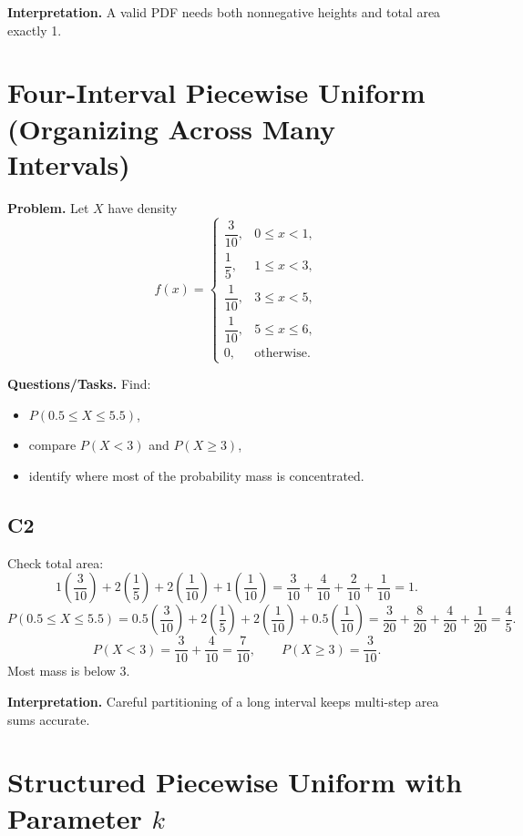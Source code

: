 \textbf{Interpretation.}
A valid PDF needs both nonnegative heights and total area exactly 1.

\section{Four-Interval Piecewise Uniform (Organizing Across Many Intervals)}

\textbf{Problem.}
Let $X$ have density
\[
f(x)=
\begin{cases}
\dfrac{3}{10}, & 0\le x<1,\\
\dfrac{1}{5}, & 1\le x<3,\\
\dfrac{1}{10}, & 3\le x<5,\\
\dfrac{1}{10}, & 5\le x\le 6,\\
0, & \text{otherwise.}
\end{cases}
\]

\textbf{Questions/Tasks.}
Find:
\begin{itemize}
    \item[(a)] $P(0.5\le X\le 5.5)$,
    \item[(b)] compare $P(X<3)$ and $P(X\ge 3)$,
    \item[(c)] identify where most of the probability mass is concentrated.
\end{itemize}

\subsection*{C2}
Check total area:
\[
1\left(\frac{3}{10}\right)+2\left(\frac{1}{5}\right)+2\left(\frac{1}{10}\right)+1\left(\frac{1}{10}\right)
=\frac{3}{10}+\frac{4}{10}+\frac{2}{10}+\frac{1}{10}=1.
\]
\[
P(0.5\le X\le 5.5)=0.5\left(\frac{3}{10}\right)+2\left(\frac{1}{5}\right)+2\left(\frac{1}{10}\right)+0.5\left(\frac{1}{10}\right)
=\frac{3}{20}+\frac{8}{20}+\frac{4}{20}+\frac{1}{20}=\frac{4}{5}.
\]
\[
P(X<3)=\frac{3}{10}+\frac{4}{10}=\frac{7}{10},
\qquad
P(X\ge 3)=\frac{3}{10}.
\]
Most mass is below 3.

\textbf{Interpretation.}
Careful partitioning of a long interval keeps multi-step area sums accurate.

\section{Structured Piecewise Uniform with Parameter $k$}


